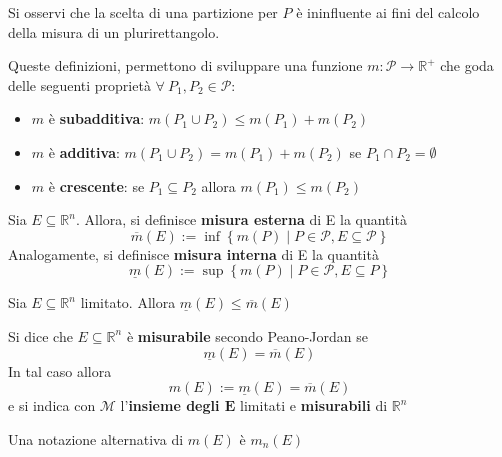 \begin{oss}
    Si osservi che la scelta di una partizione per $P$ è ininfluente ai fini del calcolo della misura di un plurirettangolo.
\end{oss}
Queste definizioni, permettono di sviluppare una funzione $m: \mathcal{P} \to \mathbb{R}^+$ che goda delle seguenti proprietà $ \forall\ P_1, P_2\in \mathcal{P}$:
\begin{itemize}
    \item $m$ è \textbf{subadditiva}: $m(P_1 \cup P_2) \leq m(P_1)+m(P_2)$
    \item $m$ è \textbf{additiva}: $m(P_1 \cup P_2)=m(P_1)+m(P_2)$ se $P_1 \cap P_2 = \emptyset$
    \item $m$ è \textbf{crescente}: se $P_1 \subseteq P_2$ allora $m(P_1) \leq m(P_2)$
\end{itemize}
\begin{definition} \label{Def: Misura interna, misura esterna}
Sia $E \subseteq \mathbb{R}^n$. Allora, si definisce \textbf{misura esterna} di E la quantità 
\begin{equation}
    \overline{m}(E) := \inf\left\{m(P) \mid P \in \mathcal{P}, E \subseteq \mathcal{P} \right\}
\end{equation}
Analogamente, si definisce \textbf{misura interna} di E la quantità
\begin{equation}
    \underline{m}(E) := \sup\left\{m(P) \mid P \in \mathcal{P}, E \subseteq P\right\}
\end{equation}
\end{definition}
\begin{proposition}
    Sia $E \subseteq \mathbb{R}^n$ limitato. Allora $\underline{m}(E) \leq \overline{m}(E)$
\end{proposition}
\begin{definition} \label{Def: Insieme misurabile}
    Si dice che $E \subseteq \mathbb{R}^n$ è \textbf{misurabile} secondo Peano-Jordan se
    \begin{equation}
        \underline{m}(E)=\overline{m}(E)
    \end{equation}
    In tal caso allora
    \begin{equation}
        m(E) := \underline{m}(E)=\overline{m}(E)
    \end{equation}
    e si indica con $\mathcal{M}$ l'\textbf{insieme degli $\mathbf{E}$} limitati e \textbf{misurabili} di $\mathbb{R}^n$
\end{definition}
\begin{oss}
    Una notazione alternativa di $m(E)$ è $m_n(E)$
\end{oss}
